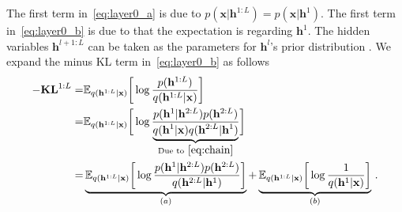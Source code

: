 \documentclass{article} %
\begin{document}
The first term in~\eqref{eq:layer0_a} is due to $p(\mathbf{x}|\mathbf{h}^{1:L}) =  p(\mathbf{x}|\mathbf{h}^{1})$. The first term in~\eqref{eq:layer0_b} is due to that the expectation is regarding $\mathbf{h}^{1}$. The hidden variables $\mathbf{h}^{l+1:L}$ can be taken as the parameters for $\mathbf{h}^l$'s  prior distribution .  We expand the minus KL term in~\eqref{eq:layer0_b} as follows
\begin{align} \label{eq:kl_1}
-\textbf{\text{KL}}^{1:L} =& \mathbb{E}_{q(\mathbf{h}^{1:L} | \mathbf{x})} \bigg[ \log  \frac{p( \mathbf{h}^{1:L})}{q(\mathbf{h}^{1:L}|\mathbf{x})}  \bigg]   \\ \notag
= &   \mathbb{E}_{q(\mathbf{h}^{1:L} | \mathbf{x})} \bigg[ \log  \frac{p( \mathbf{h}^{1}|  \mathbf{h}^{2:L}) p( \mathbf{h}^{2:L})  }{\underbrace{ q(\mathbf{h}^{1}|\mathbf{x}) q(\mathbf{h}^{2:L}|\mathbf{h}^1)}_{\text{Due to}~\eqref{eq:chain}} }  \bigg] \\ \notag
=&  \underbrace{  \mathbb{E}_{q(\mathbf{h}^{1:L} | \mathbf{x})} \bigg[ \log  \frac{p( \mathbf{h}^{1}|  \mathbf{h}^{2:L}) p( \mathbf{h}^{2:L})  }{ q(\mathbf{h}^{2:L}|\mathbf{h}^1)}  \bigg]  }_{(a)} +   \underbrace{\mathbb{E}_{q(\mathbf{h}^{1:L} | \mathbf{x})} \bigg[ \log \frac{1}{q(\mathbf{h}^{1}|\mathbf{x}) } \bigg] }_{(b)} \, .  \notag
\end{align}
\end{document}
